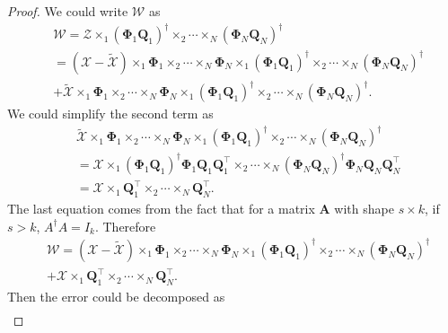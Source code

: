 \begin{proof}
We could write $\mathscr{W}$ as 
\begin{equation}
\begin{aligned}
&\mathscr{W} = \mathscr{Z}\times_1 (\mathbf{\Phi}_1 \mathbf{Q}_1)^\dag \times_2 \cdots \times_N (\mathbf{\Phi}_N \mathbf{Q}_N)^\dag \\
& = (\mathscr{X} -  \tilde{\mathscr{X}})\times_1 \mathbf{\Phi}_1 \times_2 \cdots \times_N \mathbf{\Phi}_N  \times_1 (\mathbf{\Phi}_1 \mathbf{Q}_1)^\dag \times_2 \cdots \times_N (\mathbf{\Phi}_N \mathbf{Q}_N)^\dag 
\\
&+ \tilde{\mathscr{X}}\times_1 \mathbf{\Phi}_1 \times_2 \cdots \times_N \mathbf{\Phi}_N \times_1 (\mathbf{\Phi}_1 \mathbf{Q}_1)^\dag \times_2 \cdots \times_N (\mathbf{\Phi}_N \mathbf{Q}_N)^\dag.
\end{aligned}
\end{equation}
We could simplify the second term as 
\begin{equation}
\begin{aligned}
&\tilde{\mathscr{X}}\times_1 \mathbf{\Phi}_1 \times_2 \cdots \times_N \mathbf{\Phi}_N \times_1 (\mathbf{\Phi}_1 \mathbf{Q}_1)^\dag \times_2 \cdots \times_N (\mathbf{\Phi}_N \mathbf{Q}_N)^\dag   \\
& = \mathscr{X}\times_1 (\mathbf{\Phi}_1 \mathbf{Q}_1)^\dag \mathbf{\Phi}_1\mathbf{Q}_1\mathbf{Q}_1^\top \times_2 \cdots \times_N (\mathbf{\Phi}_N \mathbf{Q}_N)^\dag \mathbf{\Phi}_N\mathbf{Q}_N\mathbf{Q}_N^\top\\
& = \mathscr{X}\times_1 \mathbf{Q}_1^\top \times_2 \cdots \times_N \mathbf{Q}_N^\top.
\end{aligned}
\end{equation}
The last equation comes from the fact that for a matrix $\mathbf{A}$ with shape $s\times k$, if $s>k$, $A^\dag A = I_k$. Therefore
\begin{equation}
\begin{aligned}
&\mathscr{W} = (\mathscr{X} -  \tilde{\mathscr{X}})\times_1 \mathbf{\Phi}_1 \times_2 \cdots \times_N \mathbf{\Phi}_N  \times_1 (\mathbf{\Phi}_1 \mathbf{Q}_1)^\dag \times_2 \cdots \times_N (\mathbf{\Phi}_N \mathbf{Q}_N)^\dag \\
&+ \mathscr{X}\times_1 \mathbf{Q}_1^\top \times_2 \cdots \times_N \mathbf{Q}_N^\top.
\end{aligned}
\end{equation}
Then the error could be decomposed as 
\begin{equation}
\label{eq:core_err_decom}
\begin{aligned}

\end{aligned}
\end{equation}
\end{proof}
